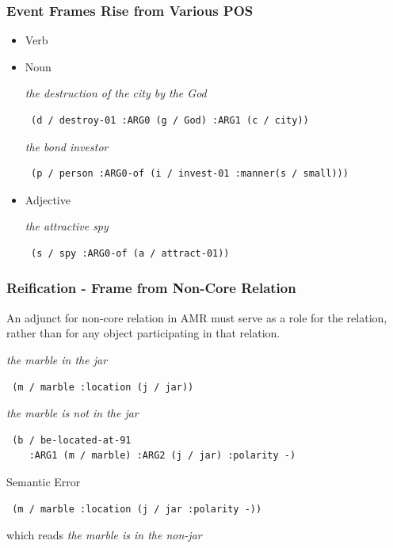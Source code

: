 \documentclass{beamer}
\begin{document}
\begin{frame}[fragile]
    \frametitle{Event Frames Rise from Various POS}

    \begin{itemize}
        \item Verb \pause
        \item Noun

            \begin{examples}
            \emph{the destruction of the city by the God}
            \begin{verbatim} (d / destroy-01 :ARG0 (g / God) :ARG1 (c / city)) \end{verbatim}
            \end{examples}

            \begin{examples}
            \emph{the bond investor}
            \begin{verbatim} (p / person :ARG0-of (i / invest-01 :manner(s / small))) \end{verbatim}
            \end{examples}


            \pause

        \item Adjective

            \begin{examples}
            \emph{the attractive spy}
            \begin{verbatim} (s / spy :ARG0-of (a / attract-01)) \end{verbatim}
            \end{examples}
    \end{itemize}
\end{frame}

\begin{frame}[fragile]
    \frametitle{Reification - Frame from Non-Core Relation}

    An adjunct for non-core relation in AMR must serve as a role for the relation,
    rather than for any object participating in that relation.

    \begin{examples}
    \emph{the marble in the jar}
    \begin{verbatim} (m / marble :location (j / jar)) \end{verbatim}

    \emph{the marble is not in the jar}
    \begin{verbatim} (b / be-located-at-91
    :ARG1 (m / marble) :ARG2 (j / jar) :polarity -) \end{verbatim}
    \end{examples}

    \begin{alertblock}{Semantic Error}
    \begin{verbatim} (m / marble :location (j / jar :polarity -)) \end{verbatim}
    which reads \emph{the marble is in the non-jar}
    \end{alertblock}
\end{frame}
\end{document}
